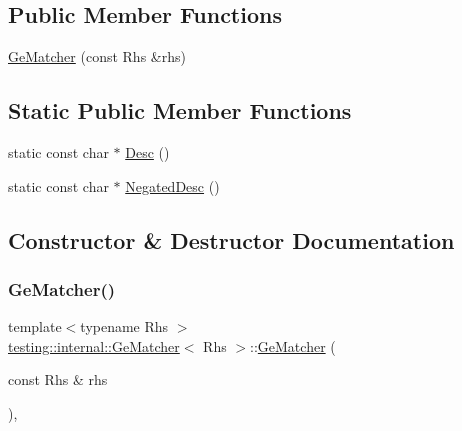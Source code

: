 \subsection*{Public Member Functions}
\begin{DoxyCompactItemize}
\item 
\hyperlink{classtesting_1_1internal_1_1_ge_matcher_aba23cbb4040d08be1a9db09b73906182}{Ge\+Matcher} (const Rhs \&rhs)
\end{DoxyCompactItemize}
\subsection*{Static Public Member Functions}
\begin{DoxyCompactItemize}
\item 
static const char $\ast$ \hyperlink{classtesting_1_1internal_1_1_ge_matcher_a5676836bfa354f4398dd083621a05877}{Desc} ()
\item 
static const char $\ast$ \hyperlink{classtesting_1_1internal_1_1_ge_matcher_a028847a76dbf02b8da3d56ce448ef053}{Negated\+Desc} ()
\end{DoxyCompactItemize}


\subsection{Constructor \& Destructor Documentation}
\mbox{\label{classtesting_1_1internal_1_1_ge_matcher_aba23cbb4040d08be1a9db09b73906182}} 
\subsubsection{\texorpdfstring{Ge\+Matcher()}{GeMatcher()}}
{\footnotesize\ttfamily template$<$typename Rhs $>$ \\
\hyperlink{classtesting_1_1internal_1_1_ge_matcher}{testing\+::internal\+::\+Ge\+Matcher}$<$ Rhs $>$\+::\hyperlink{classtesting_1_1internal_1_1_ge_matcher}{Ge\+Matcher} (\begin{DoxyParamCaption}\item[{const Rhs \&}]{rhs }\end{DoxyParamCaption})\hspace{0.3cm}{\ttfamily [inline]}, {\ttfamily [explicit]}}



